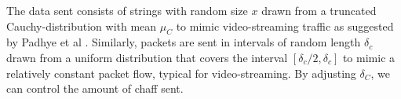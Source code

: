 \documentclass[runningheads]{llncs}\usepackage[]{graphicx}\usepackage[]{color}
\begin{document}


The data sent consists of strings with random size $x$ drawn from a truncated Cauchy-distribution with mean $\mu_C$ to mimic video-streaming traffic as suggested by Padhye et al \cite{padhye2010evading}. Similarly, packets are sent in intervals of random length $\delta_c$ drawn from a uniform distribution that covers the interval $[\delta_c/2,\delta_c]$ to mimic a relatively constant packet flow, typical for video-streaming. By adjusting $\delta_C$, we can control the amount of chaff sent. 



 






\end{document}
